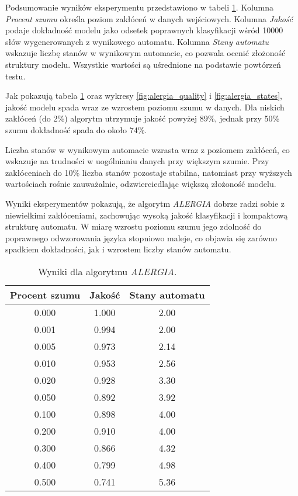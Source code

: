 Podsumowanie wyników eksperymentu przedstawiono w tabeli \ref{tab:alergia_results}. Kolumna \textit{Procent szumu} określa poziom zakłóceń w danych wejściowych. Kolumna \textit{Jakość} podaje dokładność modelu jako odsetek poprawnych klasyfikacji wśród 10000 słów wygenerowanych z wynikowego automatu. Kolumna \textit{Stany automatu} wskazuje liczbę stanów w wynikowym automacie, co pozwala ocenić złożoność struktury modelu. Wszystkie wartości są uśrednione na podstawie powtórzeń testu.

Jak pokazują tabela \ref{tab:alergia_results} oraz wykresy \ref{fig:alergia_quality} i \ref{fig:alergia_states}, jakość modelu spada wraz ze wzrostem poziomu szumu w danych. Dla niskich zakłóceń (do 2\%) algorytm utrzymuje jakość powyżej 89\%, jednak przy 50\% szumu dokładność spada do około 74\%.  

Liczba stanów w wynikowym automacie wzrasta wraz z poziomem zakłóceń, co wskazuje na trudności w uogólnianiu danych przy większym szumie. Przy zakłóceniach do 10\% liczba stanów pozostaje stabilna, natomiast przy wyższych wartościach rośnie zauważalnie, odzwierciedlając większą złożoność modelu.

Wyniki eksperymentów pokazują, że algorytm \textit{ALERGIA} dobrze radzi sobie z niewielkimi zakłóceniami, zachowując wysoką jakość klasyfikacji i kompaktową strukturę automatu. W miarę wzrostu poziomu szumu jego zdolność do poprawnego odwzorowania języka stopniowo maleje, co objawia się zarówno spadkiem dokładności, jak i wzrostem liczby stanów automatu.

\begin{table}[ht]
\centering
\caption{Wyniki dla algorytmu \textit{ALERGIA}.}
\label{tab:alergia_results}
\begin{tabular}{|c|c|c|}
\hline
Procent szumu & Jakość & Stany automatu \\ \hline
\num{0.000}  & \num{1.000} & \num{2.00}         \\ \hline
\num{0.001}  & \num{0.994} & \num{2.00}         \\ \hline
\num{0.005}  & \num{0.973} & \num{2.14}         \\ \hline
\num{0.010}  & \num{0.953} & \num{2.56}         \\ \hline
\num{0.020}  & \num{0.928} & \num{3.30}         \\ \hline
\num{0.050}  & \num{0.892} & \num{3.92}         \\ \hline
\num{0.100}  & \num{0.898} & \num{4.00}         \\ \hline
\num{0.200}  & \num{0.910} & \num{4.00}         \\ \hline
\num{0.300}  & \num{0.866} & \num{4.32}         \\ \hline
\num{0.400}  & \num{0.799} & \num{4.98}         \\ \hline
\num{0.500}  & \num{0.741} & \num{5.36}         \\ \hline
\end{tabular}
\end{table}


